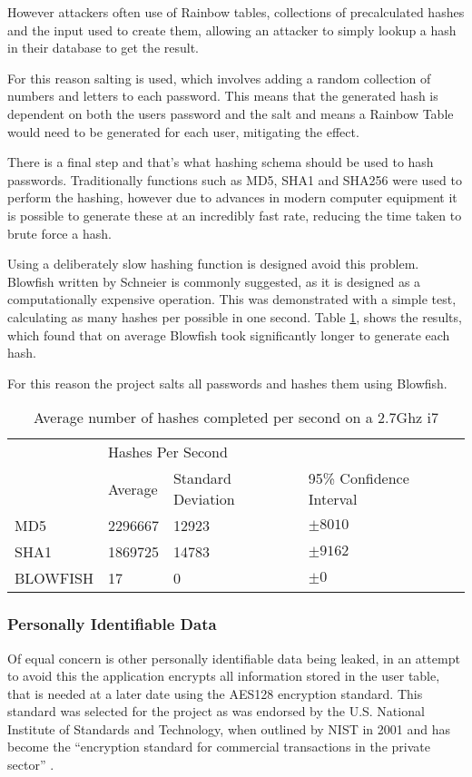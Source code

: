 However attackers often use of Rainbow tables, collections of precalculated hashes and the input used to create them, allowing an attacker to simply lookup a hash in their database to get the result.

For this reason salting is used, which involves adding a random collection of numbers and letters to each password. This means that the generated hash is dependent on both the users password and the salt and means a Rainbow Table would need to be generated for each user, mitigating the effect.

There is a final step and that's what hashing schema should be used to hash passwords. Traditionally functions such as MD5, SHA1 and SHA256 were used to perform the hashing, however due to advances in modern computer equipment it is possible to generate these at an incredibly fast rate, reducing the time taken to brute force a hash.

Using a deliberately slow hashing function is designed avoid this problem. Blowfish written by Schneier is commonly suggested, as it is designed as a computationally expensive operation. This was demonstrated with a simple test, calculating as many hashes per possible in one second. Table \ref{tab:hashspeed}, shows the results, which found that on average Blowfish took significantly longer to generate each hash.

For this reason the project salts all passwords and hashes them using Blowfish.

\begin{table}[h]
\begin{tabular}{llll}
         & \multicolumn{3}{l}{Hashes Per Second}                   \\
         & Average & Standard Deviation & 95\% Confidence Interval \\
MD5      & \num{2296667} & \num{12923}              & $\pm 8010$                 \\
SHA1     & \num{1869725} & \num{14783}             & $\pm 9162$                 \\
BLOWFISH & 17      & 0                   & $\pm 0$                    \\
\end{tabular}
\label{tab:hashspeed}
\caption{Average number of hashes completed per second on a 2.7Ghz i7 }
\end{table}

\subsubsection{Personally Identifiable Data}
Of equal concern is other personally identifiable data being leaked, in an attempt to avoid this the application encrypts all information stored in the user table, that is needed at a later date using the AES128 encryption standard. This standard was selected for the project as was endorsed by the U.S. National Institute of Standards and Technology, when outlined by NIST in 2001 and has become the ``encryption standard for commercial transactions in the private sector'' \cite{nist2010aes, stair2009informationsystems}.

